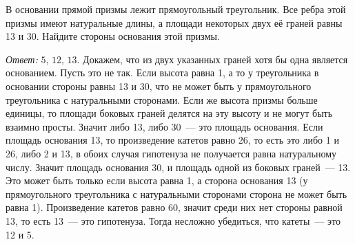 \problem
В основании прямой призмы лежит прямоугольный треугольник.
Все ребра этой призмы имеют натуральные длины, а площади некоторых двух её
граней равны 13 и 30.
Найдите стороны основания этой призмы.

\solution
\emph{Ответ:} $5$, $12$, $13$.
Докажем, что из двух указанных граней хотя бы одна является основанием.
Пусть это не так.
Если высота равна 1, а то у треугольника в основании стороны равны 13 и 30, что
не может быть у прямоугольного треугольника с натуральными сторонами.
Если же высота призмы больше единицы, то площади боковых граней делятся на эту
высоту и не могут быть взаимно просты.
Значит либо 13, либо 30~--- это площадь основания.
Если площадь основания 13, то произведение катетов равно 26, то есть это либо 1
и 26, либо 2 и 13, в обоих случая гипотенуза не получается равна натуральному
числу.
Значит площадь основания 30, и площадь одной из боковых граней~--- 13.
Это может быть только если высота равна 1, а сторона основания 13
(у прямоугольного треугольника с натуральными сторонами сторона не может быть
равна 1).
Произведение катетов равно 60, значит среди них нет стороны равной 13, то есть
13~--- это гипотенуза.
Тогда несложно убедиться, что катеты~--- это 12 и 5.
\endproblem
